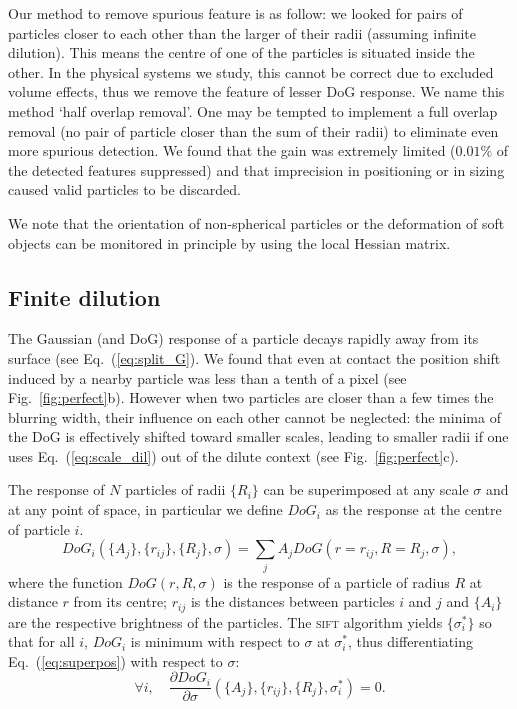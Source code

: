 \documentclass[8.5pt,twoside,twocolumn]{article}
\begin{document}
Our method to remove spurious feature is as follow: we looked for pairs of particles closer to each other than the larger of their radii (assuming infinite dilution). This means the centre of one of the particles is situated inside the other. In the physical systems we study, this cannot be correct due to excluded volume effects, thus we remove the feature of lesser DoG response. We name this method `half overlap removal'. One may be tempted to implement a full overlap removal (no pair of particle closer than the sum of their radii) to eliminate even more spurious detection. We found that the gain was extremely limited ($0.01\%$ of the detected features suppressed) and that imprecision in positioning or in sizing caused valid particles to be discarded.

We note that the orientation of non-spherical particles or the deformation of soft objects can be monitored in principle by using the local Hessian matrix.

\subsection{Finite dilution}
The Gaussian (and DoG) response of a particle decays rapidly away from its surface (see Eq.~(\ref{eq:split_G}). We found that even at contact the position shift induced by a nearby particle was less than a tenth of a pixel (see Fig.~\ref{fig:perfect}b). However when two particles are closer than a few times the blurring width, their influence on each other cannot be neglected: the minima of the DoG is effectively shifted toward smaller scales, leading to smaller radii if one uses Eq.~(\ref{eq:scale_dil}) out of the dilute context (see Fig.~\ref{fig:perfect}c).

The response of $N$ particles of radii $\lbrace R_i\rbrace$ can be superimposed at any scale $\sigma$ and at any point of space, in particular we define $DoG_i$ as the response at the centre of particle $i$.
\begin{equation}
DoG_i(\lbrace A_j\rbrace, \lbrace r_{ij}\rbrace, \lbrace R_j\rbrace, \sigma) = \sum_j A_j DoG(r=r_{ij}, R=R_j, \sigma),
\label{eq:superpos}
\end{equation}
where the function $DoG(r,R,\sigma)$ is the response of a particle of radius $R$ at distance $r$ from its centre; $r_{ij}$ is the distances between particles $i$ and $j$ and $\lbrace A_i\rbrace$ are the respective brightness of the particles. The \textsc{sift} algorithm yields $\lbrace \sigma_i^*\rbrace$ so that for all $i$, $DoG_i$ is minimum with respect to $\sigma$ at $\sigma_i^*$, thus differentiating Eq.~(\ref{eq:superpos}) with respect to $\sigma$:
\begin{equation}
\forall i,\quad \frac{\partial DoG_i}{\partial\sigma}(\lbrace A_j\rbrace, \lbrace r_{ij}\rbrace, \lbrace R_j\rbrace, \sigma_i^*) = 0.
\label{eq:DoG_min}
\end{equation}
\end{document}
